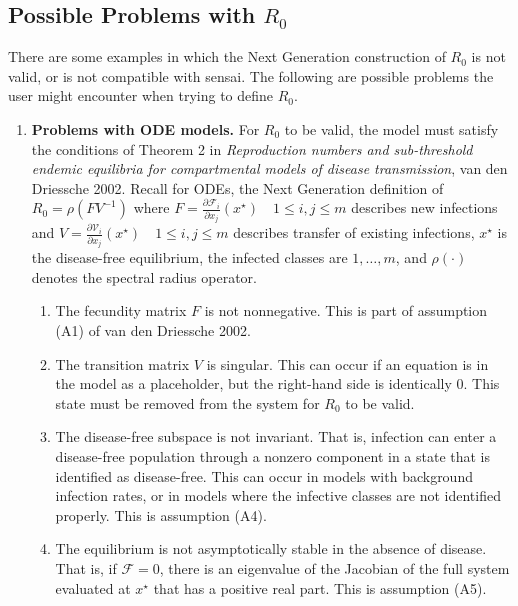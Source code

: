 \documentclass[12pt]{article}
\newcommand{\DD}{\displaystyle}
\begin{document}
\subsection{Possible Problems with $R_0$}

There are some examples in which the Next Generation construction of $R_0$ is not valid, or is not compatible with {\sc sensai}.  The following are possible problems the user might encounter when trying to define $R_0$.

\begin{enumerate}

\item \textbf{ Problems with ODE models.}  For $R_0$ to be valid, the model must satisfy the conditions of Theorem 2 in \textit{Reproduction numbers and sub-threshold endemic equilibria for compartmental models of disease transmission}, van den Driessche 2002.  Recall for ODEs, the Next Generation definition of $R_0 = \rho(FV^{-1})$ where $F = \DD\frac{\partial \mathcal{F}_i}{\partial x_j}(x^{\star}) \quad 1 \leq i,j \leq m$ describes new infections and $V = \DD\frac{\partial \mathcal{V}_i}{\partial x_j}(x^{\star}) \quad 1 \leq i,j \leq m$ describes transfer of existing infections, $x^{\star}$ is the disease-free equilibrium, the infected classes are $1,\dots,m$, and $\rho(\cdot)$ denotes the spectral radius operator.

 \begin{enumerate}

  \item The fecundity matrix $F$ is not nonnegative.  This is part of assumption (A1) of van den Driessche 2002.
  \item The transition matrix $V$ is singular.  This can occur if an equation is in the model as a placeholder, but the right-hand side is identically 0.  This state must be removed from the system for $R_0$ to be valid.
  \item The disease-free subspace is not invariant.  That is, infection can enter a disease-free population through a nonzero component in a state that is identified as disease-free.  This can occur in models with background infection rates, or in models where the infective classes are not identified properly.  This is assumption (A4).
  \item The equilibrium is not asymptotically stable in the absence of disease.  That is, if $\mathcal{F} = 0$, there is an eigenvalue of the Jacobian of the full system evaluated at $x^{\star}$ that has a positive real part.  This is assumption (A5).


\end{enumerate}
\end{enumerate}
\end{document}
